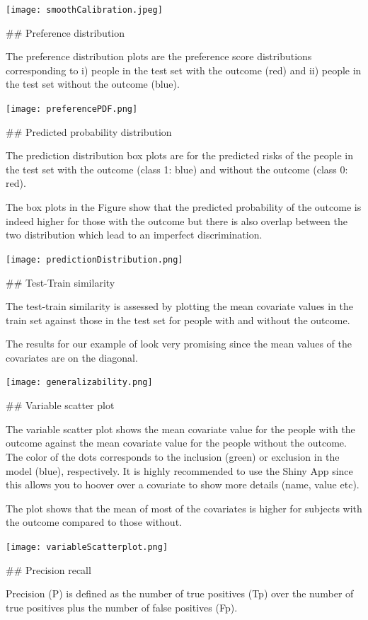 \documentclass[
]{article}
\begin{document}
\texttt{[image: smoothCalibration.jpeg]}

\newpage \#\# Preference distribution

The preference distribution plots are the preference score distributions
corresponding to i) people in the test set with the outcome (red) and
ii) people in the test set without the outcome (blue).

\texttt{[image: preferencePDF.png]}

\newpage \#\# Predicted probability distribution

The prediction distribution box plots are for the predicted risks of the
people in the test set with the outcome (class 1: blue) and without the
outcome (class 0: red).

The box plots in the Figure show that the predicted probability of the
outcome is indeed higher for those with the outcome but there is also
overlap between the two distribution which lead to an imperfect
discrimination.

\texttt{[image: predictionDistribution.png]}

\newpage \#\# Test-Train similarity

The test-train similarity is assessed by plotting the mean covariate
values in the train set against those in the test set for people with
and without the outcome.

The results for our example of look very promising since the mean values
of the covariates are on the diagonal.

\texttt{[image: generalizability.png]}

\newpage \#\# Variable scatter plot

The variable scatter plot shows the mean covariate value for the people
with the outcome against the mean covariate value for the people without
the outcome. The color of the dots corresponds to the inclusion (green)
or exclusion in the model (blue), respectively. It is highly recommended
to use the Shiny App since this allows you to hoover over a covariate to
show more details (name, value etc).

The plot shows that the mean of most of the covariates is higher for
subjects with the outcome compared to those without.

\texttt{[image: variableScatterplot.png]}

\newpage \#\# Precision recall

Precision (P) is defined as the number of true positives (Tp) over the
number of true positives plus the number of false positives (Fp).
\end{document}
